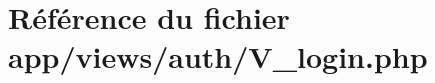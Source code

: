 \hypertarget{_v__login_8php}{}\section{Référence du fichier app/views/auth/\+V\+\_\+login.php}
\label{_v__login_8php}

